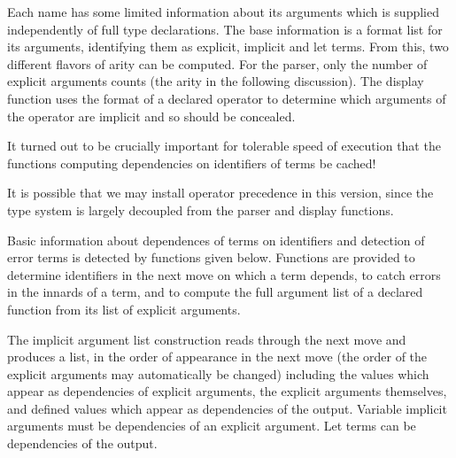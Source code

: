 \documentclass[12pt]{article}
\begin{document}
Each name has some limited information about its arguments which is supplied independently of full type declarations.  The base information is
a format list for its arguments, identifying them as explicit, implicit and let terms.  From this, two different flavors of arity can be computed.  For the parser,
only the number of explicit arguments counts (the arity in the following discussion).    The display function uses the format of a declared operator to determine
which arguments of the operator are implicit and so should be concealed.

It turned out to be crucially important for tolerable speed of execution that the functions computing dependencies on identifiers of terms be cached!

It is possible that we may install operator precedence in this version, since the type system is largely decoupled from the parser and display functions.

Basic information about dependences of terms on identifiers and detection of error terms is detected by functions given below.  Functions are provided to determine identifiers
in the next move on which a term depends, to catch errors in the innards of a term, and to compute the full argument list of a declared function from its list of explicit arguments.

The implicit argument list construction reads through the next move and produces a list, in the order of appearance in the next move (the order of the explicit arguments may automatically be changed) including the values which appear as dependencies of explicit arguments, the explicit arguments themselves, and defined values which appear as dependencies of the output.  Variable implicit arguments must be dependencies of an explicit argument.  Let terms can be dependencies of the output.
\end{document}

